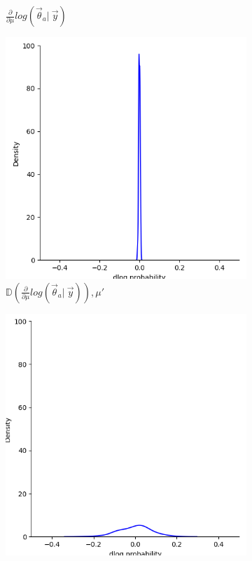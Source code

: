 \begin{figure}
\begin{subfigure}{0.475\textwidth}
        \caption[]{$\frac{\partial}{\partial\mu} log(\vec{\theta}_a |\ \vec{y})$}
    \end{subfigure}
    \caption[Score functions of the log-likelihood of observations over $-20<x<20$]{}
    \label{fig:scorefunctions}
\end{figure}
\begin{figure}
    \centering
    \begin{subfigure}{0.475\textwidth}
        \includegraphics[width=\textwidth]{figs/background/deriv_dist_10.png}
        \caption[]{$\mathbb{D}\left(\frac{\partial}{\partial\mu} log(\vec{\theta}_a |\ \vec{y})\right), \mu'$}
    \end{subfigure}
    \begin{subfigure}{0.475\textwidth}
        \includegraphics[width=\textwidth]{figs/background/deriv_dist_0.5.png}

\end{subfigure}
\end{figure}
